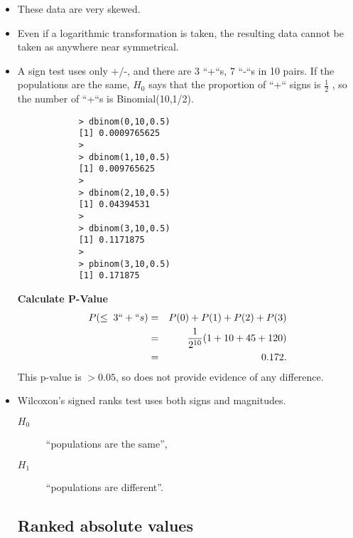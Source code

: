 \documentclass[a4paper,12pt]{article}
\begin{document}
	
	
	\large
	\begin{itemize}
		\item 
		These data are very skewed. %
		\item Even if a logarithmic transformation
		is taken, the resulting data cannot be taken as anywhere near symmetrical.
		\item A sign test uses only +/-, and there are 3 ``+``s, 7 ``-``s in 10 pairs. If the populations are the
		same, $H_0$ says that the proportion of ``+`` signs is $ \frac{1}{2}$ , so the number of ``+``s is Binomial(10,1/2).
		
		\newpage
		\begin{framed}
			\begin{verbatim}
			> dbinom(0,10,0.5)
			[1] 0.0009765625
			>
			> dbinom(1,10,0.5)
			[1] 0.009765625
			>
			> dbinom(2,10,0.5)
			[1] 0.04394531
			>
			> dbinom(3,10,0.5)
			[1] 0.1171875
			>
			> pbinom(3,10,0.5)
			[1] 0.171875
			\end{verbatim}
		\end{framed}
		\noindent \textbf{Calculate P-Value}\\
		\begin{eqnarray*}
			P(\leq \;3 ``+``s) &=& P(0) +P(1) +P(2) +P(3) \\
			&=& \frac{1}{2^{10}} (1 + 10 + 45 + 120) \\
			&=& 0.172.\\
		\end{eqnarray*}
		This p-value is $>0.05$, so does not provide evidence of any difference.
		
		\newpage
		\item Wilcoxon’s signed ranks test uses both signs and magnitudes.
		\begin{description}
			\item[ $H_0$] “populations are the same”, 
			\item[ $H_1$] “populations are different”. 
		\end{description}
		\subsection*{Ranked absolute values}
		

\end{itemize}
\end{document}
